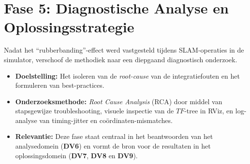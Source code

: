 \section{Fase 5: Diagnostische Analyse en Oplossingsstrategie}
Nadat het ``rubberbanding''-effect werd vastgesteld tijdens SLAM-operaties in de simulator, verschoof de methodiek naar een diepgaand diagnostisch onderzoek.
\begin{itemize}
    \item \textbf{Doelstelling:} Het isoleren van de \textit{root-cause} van de integratiefouten en het formuleren van best-practices.
    \item \textbf{Onderzoeksmethode:} \textit{Root Cause Analysis} (RCA) door middel van stapsgewijze troubleshooting, visuele inspectie van de $TF$-tree in RViz, en log-analyse van timing-jitter en coördinaten-mismatches.
    \item \textbf{Relevantie:} Deze fase staat centraal in het beantwoorden van het analysedomein (\textbf{DV6}) en vormt de bron voor de resultaten in het oplossingsdomein (\textbf{DV7}, \textbf{DV8} en \textbf{DV9}).
\end{itemize}
